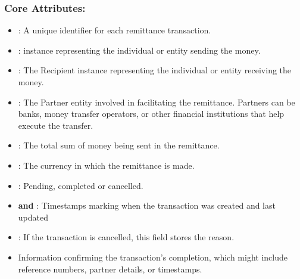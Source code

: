 \documentclass[onecolumn, letterpaper, ]{report}
\begin{document}
            \subsubsection{Core Attributes:}
            \begin{itemize}
                \item \textbf{}:  A unique identifier for each remittance transaction.
                \item \textbf{}: instance representing the individual or entity sending the money. 
                \item \textbf{}: The Recipient instance representing the individual or entity receiving the money.
                \item \textbf{}: The Partner entity involved in facilitating the remittance. Partners can be banks, money transfer operators, or other financial institutions that help execute the transfer.
                \item \textbf{}: The total sum of money being sent in the remittance.
                \item \textbf{}: The currency in which the remittance is made. 
                \item \textbf{}: Pending, completed or cancelled.
                \item \textbf{ and }: Timestamps marking when the transaction was created and last updated
                \item \textbf{}: If the transaction is cancelled, this field stores the reason.
                \item \textbf{} Information confirming the transaction's completion, which might include reference numbers, partner details, or timestamps.
                
            \end{itemize}
\end{document}
